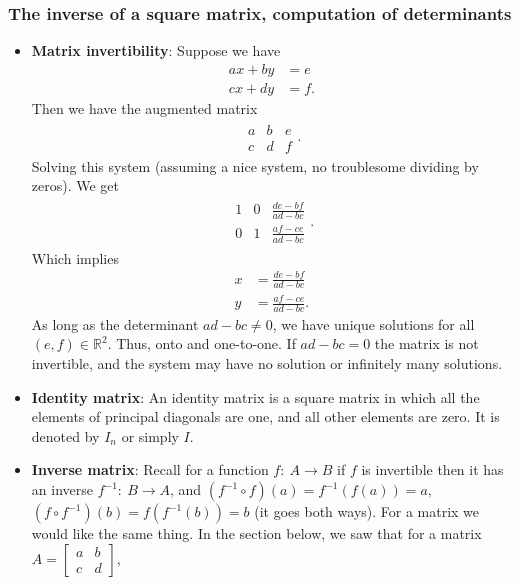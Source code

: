\documentclass{report}
\begin{document}
    \subsubsection{The inverse of a square matrix, computation of determinants}
    \begin{itemize}
            \item \textbf{Matrix invertibility}: Suppose we have
        \begin{align*}
            ax + by  &=e\\
            cx + dy &=f
        .\end{align*}
        Then we have the augmented matrix
        \begin{align*}
            \begin{array}{cc|c}
                a & b & e\\
                c & d & f
            \end{array}
        .\end{align*}
        Solving this system (assuming a nice system, no troublesome dividing by zeros). We get 
        \begin{align*}
            \begin{array}{cc|c}
                1 & 0 & \frac{de-bf}{ad-bc} \\
                0 & 1 & \frac{af-ce}{ad-bc}
            \end{array}
        .\end{align*}
        Which implies
        \begin{align*}
            x &= \frac{de-bf}{ad-bc} \\
            y &= \frac{af - ce}{ad-bc}
        .\end{align*}
        As long as the determinant $ad-bc \ne 0$, we have unique solutions for all $(e,f) \in \mathbb{R}^{2}$. Thus, onto and one-to-one. If $ad -bc = 0$ the matrix is not invertible, and the system may have no solution or infinitely many solutions.
    \item \textbf{Identity matrix}: An identity matrix is a square matrix in which all the elements of principal diagonals are one, and all other elements are zero. It is denoted by $I_{n}$ or simply $I$.
    \item \textbf{Inverse matrix}: Recall for a function $f:\ A\to B$ if $f$ is invertible then it has an inverse $f^{-1}:\ B\to A$, and $(f^{-1} \circ f)(a) = f^{-1}(f(a)) = a$, $(f \circ f^{-1})(b) = f(f^{-1}(b)) = b$ (it goes both ways). 
        \bigbreak \noindent 
        For a matrix we would like the same thing. In the section below, we saw that for a matrix $A = \begin{bmatrix} a & b \\ c & d\end{bmatrix}$,

\end{itemize}
\end{document}
